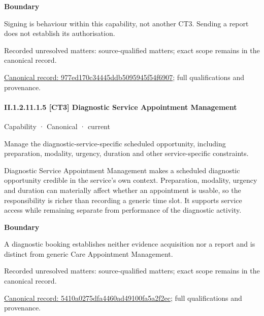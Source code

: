 \textbf{Boundary}



Signing is behaviour within this capability, not another CT3. Sending a report does not establish its authorisation.


{\small Recorded unresolved matters: source-qualified matters; exact scope remains in the canonical record.}\par
{\footnotesize \href{../../../../continuum/strategy/capability/977ed170c34445ddb5095945f54f6907.md}{Canonical record: 977ed170c34445ddb5095945f54f6907}; full qualifications and provenance.}\par
\paragraph*{II.1.2.11.1.5 [CT3] Diagnostic Service Appointment Management}
\label{navigation:II.1.2.11.1.5}

\label{element:5410a0275dfa4460ad49100fa5a2f2ec}
{\small Capability · Canonical · current}\par

Manage the diagnostic-service-specific scheduled opportunity, including preparation, modality, urgency, duration and other service-specific constraints.



Diagnostic Service Appointment Management makes a scheduled diagnostic opportunity credible in the service's own context. Preparation, modality, urgency and duration can materially affect whether an appointment is usable, so the responsibility is richer than recording a generic time slot. It supports service access while remaining separate from performance of the diagnostic activity.



\textbf{Boundary}



A diagnostic booking establishes neither evidence acquisition nor a report and is distinct from generic Care Appointment Management.


{\small Recorded unresolved matters: source-qualified matters; exact scope remains in the canonical record.}\par
{\footnotesize \href{../../../../continuum/strategy/capability/5410a0275dfa4460ad49100fa5a2f2ec.md}{Canonical record: 5410a0275dfa4460ad49100fa5a2f2ec}; full qualifications and provenance.}\par
